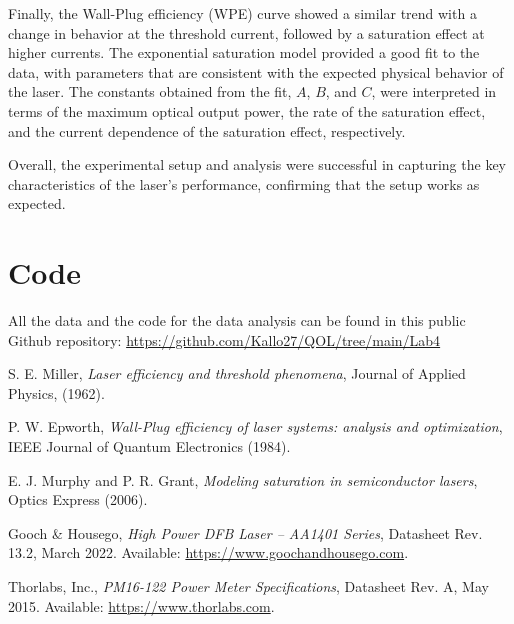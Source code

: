 \documentclass[prl,twocolumn]{revtex4-1}
\begin{document}
Finally, the Wall-Plug efficiency (WPE) curve showed a similar trend with a change in behavior at the threshold current, followed by a saturation effect at higher currents. The exponential saturation model provided a good fit to the data, with parameters that are consistent with the expected physical behavior of the laser. The constants obtained from the fit, \(A\), \(B\), and \(C\), were interpreted in terms of the maximum optical output power, the rate of the saturation effect, and the current dependence of the saturation effect, respectively.

Overall, the experimental setup and analysis were successful in capturing the key characteristics of the laser's performance, confirming that the setup works as expected.

\section{Code}
All the data and the code for the data analysis can be found in this public Github repository: \href{https://github.com/Kallo27/QOL/tree/main/Lab4}{https://github.com/Kallo27/QOL/tree/main/Lab4}

\begin{thebibliography}{99}

S. E. Miller, \textit{Laser efficiency and threshold phenomena}, Journal of Applied Physics, (1962).

P. W. Epworth, \textit{Wall-Plug efficiency of laser systems: analysis and optimization}, IEEE Journal of Quantum Electronics (1984).

E. J. Murphy and P. R. Grant, \textit{Modeling saturation in semiconductor lasers}, Optics Express (2006).

Gooch \& Housego, \textit{High Power DFB Laser – AA1401 Series}, Datasheet Rev. 13.2, March 2022. Available: \url{https://www.goochandhousego.com}.

Thorlabs, Inc., \textit{PM16-122 Power Meter Specifications}, Datasheet Rev. A, May 2015. Available: \url{https://www.thorlabs.com}.

\end{thebibliography}
\end{document}
